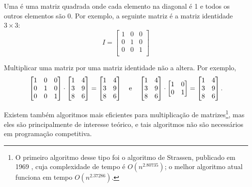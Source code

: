
Uma  é uma matriz quadrada
onde cada elemento na diagonal é 1
e todos os outros elementos são 0.
Por exemplo, a seguinte matriz
é a matriz identidade $3 \times 3$:
\[
 I = \begin{bmatrix}
  1 & 0 & 0 \\
  0 & 1 & 0 \\
  0 & 0 & 1 \\
 \end{bmatrix}
\]

\begin{samepage}
Multiplicar uma matriz por uma matriz identidade
não a altera. Por exemplo,
\[
 \begin{bmatrix}
  1 & 0 & 0 \\
  0 & 1 & 0 \\
  0 & 0 & 1 \\
 \end{bmatrix}
\cdot
 \begin{bmatrix}
  1 & 4 \\
  3 & 9 \\
  8 & 6 \\
 \end{bmatrix}
=
 \begin{bmatrix}
  1 & 4 \\
  3 & 9 \\
  8 & 6 \\
 \end{bmatrix} \hspace{10px} \textrm{e} \hspace{10px}
 \begin{bmatrix}
  1 & 4 \\
  3 & 9 \\
  8 & 6 \\
 \end{bmatrix}
\cdot
 \begin{bmatrix}
  1 & 0 \\
  0 & 1 \\
 \end{bmatrix}
=
 \begin{bmatrix}
  1 & 4 \\
  3 & 9 \\
  8 & 6 \\
 \end{bmatrix}.
\]
\end{samepage}

Existem também algoritmos mais eficientes
para multiplicação de matrizes\footnote{O primeiro algoritmo desse tipo
foi o algoritmo de Strassen,
publicado em 1969 \cite{str69},
cuja complexidade de tempo é $O(n^{2.80735})$;
o melhor algoritmo atual \cite{gal14}
funciona em tempo $O(n^{2.37286})$.},
mas eles são principalmente de interesse teórico,
e tais algoritmos não são necessários
em programação competitiva.


